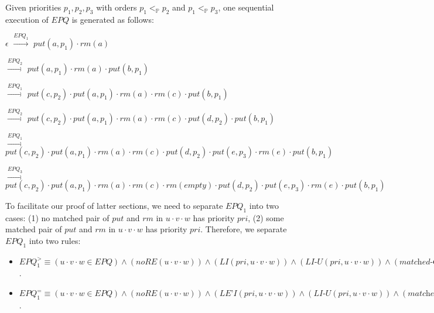 \begin{example}\label{example:generate extended priority queue executions}
Given priorities $p_1,p_2,p_3$ with orders $p_1 <_{\mathbb{P}} p_2$ and $p_1 <_{\mathbb{P}} p_3$, one sequential execution of $\textit{EPQ}$ is generated as follows:

$\epsilon$ $\xrightarrow{\textit{EPQ}_1}$ $\textit{put}(a,p_1) \cdot \textit{rm}(a)$

$\xrightarrow{\textit{EPQ}_2}$ $\textit{put}(a,p_1) \cdot \textit{rm}(a) \cdot \textit{put}(b,p_1)$

$\xrightarrow{\textit{EPQ}_1}$ $\textit{put}(c,p_2) \cdot \textit{put}(a,p_1) \cdot \textit{rm}(a) \cdot \textit{rm}(c) \cdot \textit{put}(b,p_1)$

$\xrightarrow{\textit{EPQ}_2}$ $\textit{put}(c,p_2) \cdot \textit{put}(a,p_1) \cdot \textit{rm}(a) \cdot \textit{rm}(c) \cdot \textit{put}(d,p_2) \cdot \textit{put}(b,p_1)$

$\xrightarrow{\textit{EPQ}_1}$ $\textit{put}(c,p_2) \cdot \textit{put}(a,p_1) \cdot \textit{rm}(a) \cdot \textit{rm}(c) \cdot \textit{put}(d,p_2) \cdot \textit{put}(e,p_3) \cdot \textit{rm}(e) \cdot \textit{put}(b,p_1)$

$\xrightarrow{\textit{EPQ}_3}$ $\textit{put}(c,p_2) \cdot \textit{put}(a,p_1) \cdot \textit{rm}(a) \cdot \textit{rm}(c) \cdot \textit{rm}(\textit{empty}) \cdot \textit{put}(d,p_2) \cdot \textit{put}(e,p_3) \cdot \textit{rm}(e) \cdot \textit{put}(b,p_1)$
\end{example}

To facilitate our proof of latter sections, we need to separate $\textit{EPQ}_1$ into two cases: (1) no matched pair of $\textit{put}$ and $\textit{rm}$ in $u \cdot v \cdot w$ has priority $\textit{pri}$, (2) some matched pair of $\textit{put}$ and $\textit{rm}$ in $u \cdot v \cdot w$ has priority $\textit{pri}$.  Therefore, we separate $\textit{EPQ}_1$ into two rules:

\begin{itemize}
\setlength{\itemsep}{0.5pt}
\item[-] $\textit{EPQ}_1^{>} \equiv (u \cdot v \cdot w \in \textit{EPQ}) \wedge
(\textit{noRE}(u \cdot v \cdot w)) \wedge
(\textit{LI}(\textit{pri}, u \cdot v \cdot w)) \wedge
(\textit{LI-U}(\textit{pri},u \cdot v \cdot w)) \wedge
(\textit{matched-C}(u \cdot v,\textit{pri}) ) %
\Rightarrow
(u \cdot \textit{put}(\textit{itm},\textit{pri}) \cdot v \cdot \textit{rm}(\textit{itm}) \cdot w \in \textit{EPQ})$.

\item[-] $\textit{EPQ}_1^{=} \equiv (u \cdot v \cdot w \in \textit{EPQ}) \wedge
(\textit{noRE}(u \cdot v \cdot w)) \wedge
(\textit{LE'I}(\textit{pri}, u \cdot v \cdot w)) \wedge
(\textit{LI-U}(\textit{pri},u \cdot v \cdot w)) \wedge
(\textit{matched-C}(u \cdot v,\textit{pri}) ) %
\wedge
(\textit{putInSeq}(u \cdot v \cdot w,u,\textit{pri}))
\Rightarrow
(u \cdot \textit{put}(\textit{itm},\textit{pri}) \cdot v \cdot \textit{rm}(\textit{itm}) \cdot w \in \textit{EPQ})$.
\end{itemize}


